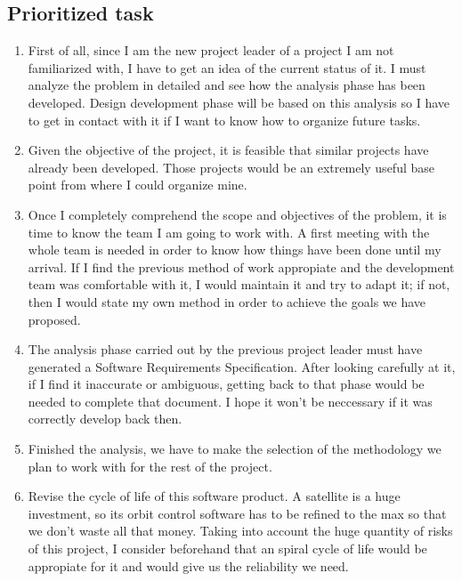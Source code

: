 \documentclass{article}
\begin{document}
\subsection{Prioritized task}
\begin{enumerate}

\item First of all, since I am the new project leader of a project I am not familiarized with, I have to get an idea of the current status of it. I must analyze the problem in detailed and see how the analysis phase has been developed. Design development phase will be based on this analysis so I have to get in contact with it if I want to know how to organize future tasks. 

\item Given the objective of the project, it is feasible that similar projects have already been developed. Those projects would be an extremely useful base point from where I could organize mine.

\item Once I completely comprehend the scope and objectives of the problem, it is time to know the team I am going to work with. A first meeting with the whole team is needed in order to know how things have been done until my arrival. If I find the previous method of work appropiate and the development team was comfortable with it, I would maintain it and try to adapt it; if not, then I would state my own method in order to achieve the goals we have proposed.

\item The analysis phase carried out by the previous project leader must have generated a Software Requirements Specification. After looking carefully at it, if I find it inaccurate or ambiguous, getting back to that phase would be needed to complete that document. I hope it won't be neccessary if it was correctly develop back then.

\item Finished the analysis, we have to make the selection of the methodology we plan to work with for the rest of the project. 

\item Revise the cycle of life of this software product. A satellite is a huge investment, so its orbit control software has to be refined to the max so that we don't waste all that money. Taking into account the huge quantity of risks of this project, I consider beforehand that an spiral cycle of life would be appropiate for it and would give us the reliability we need.


\end{enumerate}
\end{document}
